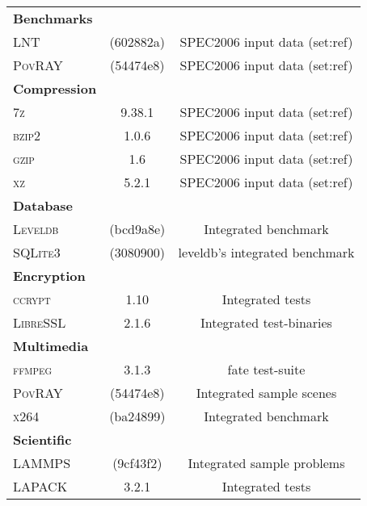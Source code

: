 \begin{longtable}{lcC} \toprule
         &  & \\
    \midrule
    \textbf{Benchmarks}\\
    \textsc{LNT}                      & (602882a)               & SPEC2006 input data (set:ref)\\
    \textsc{PovRAY}                   & (54474e8)               & SPEC2006 input data (set:ref)\\
    \midrule
    \textbf{Compression}\\
    \textsc{7z}                       & 9.38.1                  & SPEC2006 input data (set:ref)\\
    \textsc{bzip2}                    & 1.0.6                   & SPEC2006 input data (set:ref)\\
    \textsc{gzip}                     & 1.6                     & SPEC2006 input data (set:ref)\\
    \textsc{xz}                       & 5.2.1                   & SPEC2006 input data (set:ref)\\
    \midrule
    \textbf{Database}\\
    \textsc{Leveldb}                  & (bcd9a8e)               & Integrated benchmark\\
    \textsc{SQLite3}                  & (3080900)               & leveldb's integrated benchmark\\
    \midrule
    \textbf{Encryption}\\
    \textsc{ccrypt}                   & 1.10                    & Integrated tests\\
    \textsc{LibreSSL}                 & 2.1.6                   & Integrated test-binaries\\
    \midrule
    \textbf{Multimedia}\\
    \textsc{ffmpeg}                   & 3.1.3                   & fate test-suite\\
    \textsc{PovRAY}                   & (54474e8)               & Integrated sample scenes\\
    \textsc{x264}                     & (ba24899)               & Integrated benchmark\\
    \midrule
    \textbf{Scientific}\\
    \textsc{LAMMPS}                   & (9cf43f2)               & Integrated sample problems\\
    \textsc{LAPACK}                   & 3.2.1                   & Integrated tests\\

\end{longtable}
